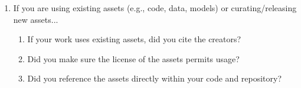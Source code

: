 \documentclass{article}
\begin{document}
\begin{enumerate}
\item If you are using existing assets (e.g., code, data, models) or curating/releasing new assets...
\begin{enumerate}
  \item If your work uses existing assets, did you cite the creators?
    \answerTODO{}
  \item Did you make sure the license of the assets permits usage?
    \answerTODO{}
  \item Did you reference the assets directly within your code and repository?
    \answerTODO{}
\end{enumerate}
\end{enumerate}
\end{document}
